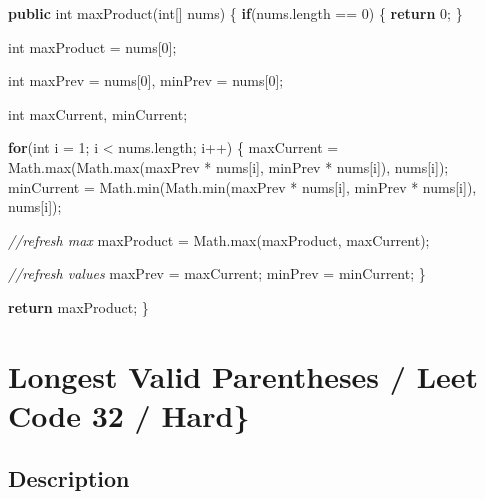 \documentclass[]{book}
\newenvironment{Shaded}{\begin{snugshade}}{\end{snugshade}}
\newcommand{\BuiltInTok}[1]{#1}
\newcommand{\CommentTok}[1]{\textcolor[rgb]{0.56,0.35,0.01}{\textit{#1}}}
\newcommand{\DataTypeTok}[1]{\textcolor[rgb]{0.13,0.29,0.53}{#1}}
\newcommand{\DecValTok}[1]{\textcolor[rgb]{0.00,0.00,0.81}{#1}}
\newcommand{\FunctionTok}[1]{\textcolor[rgb]{0.00,0.00,0.00}{#1}}
\newcommand{\KeywordTok}[1]{\textcolor[rgb]{0.13,0.29,0.53}{\textbf{#1}}}
\newcommand{\NormalTok}[1]{#1}
\begin{document}
\begin{Shaded}
\begin{Highlighting}[]
\KeywordTok{public} \DataTypeTok{int} \FunctionTok{maxProduct}\NormalTok{(}\DataTypeTok{int}\NormalTok{[] nums) \{}
    \KeywordTok{if}\NormalTok{(nums.}\FunctionTok{length}\NormalTok{ == }\DecValTok{0}\NormalTok{) \{}
        \KeywordTok{return} \DecValTok{0}\NormalTok{;}
\NormalTok{    \}}

    \DataTypeTok{int}\NormalTok{ maxProduct = nums[}\DecValTok{0}\NormalTok{];}

    \DataTypeTok{int}\NormalTok{ maxPrev = nums[}\DecValTok{0}\NormalTok{], minPrev = nums[}\DecValTok{0}\NormalTok{];}

    \DataTypeTok{int}\NormalTok{ maxCurrent, minCurrent;}

    \KeywordTok{for}\NormalTok{(}\DataTypeTok{int}\NormalTok{ i = }\DecValTok{1}\NormalTok{; i < nums.}\FunctionTok{length}\NormalTok{; i++) \{}
\NormalTok{        maxCurrent = }\BuiltInTok{Math}\NormalTok{.}\FunctionTok{max}\NormalTok{(}\BuiltInTok{Math}\NormalTok{.}\FunctionTok{max}\NormalTok{(maxPrev * nums[i], minPrev * nums[i]), nums[i]);}
\NormalTok{        minCurrent = }\BuiltInTok{Math}\NormalTok{.}\FunctionTok{min}\NormalTok{(}\BuiltInTok{Math}\NormalTok{.}\FunctionTok{min}\NormalTok{(maxPrev * nums[i], minPrev * nums[i]), nums[i]);}

        \CommentTok{//refresh max}
\NormalTok{        maxProduct = }\BuiltInTok{Math}\NormalTok{.}\FunctionTok{max}\NormalTok{(maxProduct, maxCurrent);}

        \CommentTok{//refresh values}
\NormalTok{        maxPrev = maxCurrent;}
\NormalTok{        minPrev = minCurrent;}
\NormalTok{    \}}

    \KeywordTok{return}\NormalTok{ maxProduct;}
\NormalTok{\}}
\end{Highlighting}
\end{Shaded}

\hypertarget{longest-valid-parentheses-leet-code-32-hard}{%
\section{Longest Valid Parentheses / Leet Code 32 / Hard\}}\label{longest-valid-parentheses-leet-code-32-hard}}

\hypertarget{description-27}{%
\subsection{Description}\label{description-27}}
\end{document}
